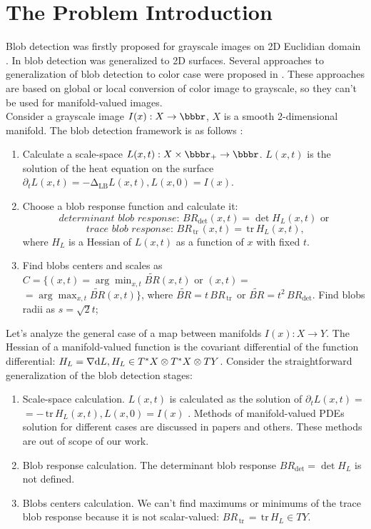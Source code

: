 \documentclass{llncs}
\newcommand{\LaplaceBeltrami}{\mathrm{\Delta_{{LB}}}}
\newcommand{\partderiv}[2]{\partial_{#2} {#1}}
\newcommand{\toreal}{\rightarrow\bbbr}
\newcommand{\CovariantDiff}{\nabla}
\newcommand{\Diff}{\mathrm{d}}
\newcommand{\TangentBundle}[1]{T{#1}}
\newcommand{\CotangentBundle}[1]{\tensor*{T}{^{*}}{#1}}
\newcommand {\tr}{{\,}\mathrm{tr}{\,}}
\begin{document}
\section{The Problem Introduction}
Blob detection was firstly proposed for grayscale images on 2D Euclidian domain \cite{blob}. In \cite{ScalarBlob3D} blob detection was generalized to 2D surfaces. Several approaches to generalization of blob detection to color case were proposed in \cite{ColorBlob,GROM}. These approaches are based on global or local conversion of color image to grayscale, so they can't be used for manifold-valued images.
\\
Consider a grayscale image $I(x):X \toreal$, $X$ is a smooth 2-dimensional manifold. The blob detection framework is as follows \cite{ScalarBlob3D}:
\begin{enumerate} 
\item Calculate a scale-space $L(x,t):X\times \bbbr_{+} \toreal$. $L(x,t)$ is the solution of the heat equation on the surface
  $\partderiv{L(x, t)}{t}=-\LaplaceBeltrami{ L(x, t)},L(x, 0)=I(x)$.
\item Choose a blob response function and calculate it: 
\begin{equation} \textit{ determinant blob response: } BR_{\det}(x, t)=\det{H_L(x,t)}\textrm{  or } \label{blob_det}\end{equation} 
\begin{equation} \textit{ trace blob response: } BR_{\tr}(x, t)=\tr {H_L(x,t)}, \label{blob_tr}											\end{equation} 
 where $H_L$ is a Hessian of $L(x, t)$ as a function of $x$ with fixed $t$.
\item Find blobs centers and scales as $C=\{(x, t)=\arg \min_{x,t} \tilde{BR}(x, t)\textrm{  or } (x, t)=$
$=\arg \max_{x,t}\tilde{BR}(x, t)\}$, where 
$\tilde{BR}=t\,BR_{\tr}$ or $\tilde{BR}=t^2\,BR_{\det}$. Find blobs radii as $s=\sqrt{2} t$;
\end{enumerate}

Let's analyze the general case of a map between manifolds $I(x):X \to Y$. The Hessian of a manifold-valued function is the covariant differential of the function differential: $H_L=\CovariantDiff \Diff L,H_L \in \CotangentBundle{X}\otimes\CotangentBundle{X}\otimes\TangentBundle{Y}$. Consider the straightforward generalization of the blob detection stages:
\begin{enumerate}
\item Scale-space calculation. $L(x,t)$ is calculated as the solution of $\partderiv{L(x, t)}{t}=$ $=-\tr H_L(x, t), L(x, 0)=I(x)$ 
. Methods of manifold-valued PDEs solution for different cases are discussed in papers \cite{Harmonic,Kimmel,DTI} and others. These methods are out of scope of our work.
\item Blob response calculation. The determinant blob response $BR_{\det}=\det H_L$ is not defined. 
\item Blobs centers calculation. We can't find maximums or minimums of the trace blob response because it is not scalar-valued: $BR_{\tr}=\tr{H_L} \in TY$.
\end{enumerate} 
\end{document}
